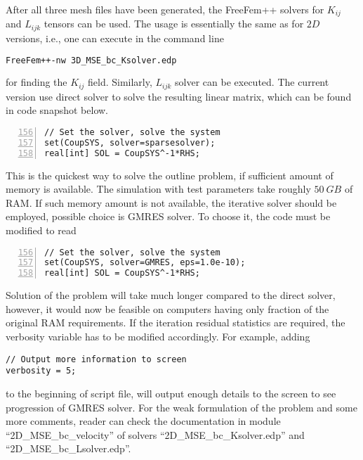 \documentclass[12pt,a4paper]{article}
\begin{document}
After all three mesh files have been generated, the FreeFem++ solvers for $K_{ij}$ and $L_{ijk}$ tensors can be used. The usage is essentially the same as for $2D$ versions, i.e., one can execute in the command line
\begin{lstlisting}[language=tex]
FreeFem++-nw 3D_MSE_bc_Ksolver.edp
\end{lstlisting}
for finding the $K_{ij}$ field. Similarly, $L_{ijk}$ solver can be executed. The current version use direct solver to solve the resulting linear matrix, which can be found in code snapshot below.
\begin{lstlisting}[numbers=left,firstnumber=156]
// Set the solver, solve the system
set(CoupSYS, solver=sparsesolver);
real[int] SOL = CoupSYS^-1*RHS;
\end{lstlisting}
This is the quickest way to solve the outline problem, if sufficient amount of memory is available. The simulation with test parameters take roughly $50\ GB$ of RAM. If such memory amount is not available, the iterative solver should be employed, possible choice is GMRES solver. To choose it, the code must be modified to read
\begin{lstlisting}[numbers=left,firstnumber=156]
// Set the solver, solve the system
set(CoupSYS, solver=GMRES, eps=1.0e-10);
real[int] SOL = CoupSYS^-1*RHS;
\end{lstlisting}
Solution of the problem will take much longer compared to the direct solver, however, it would now be feasible on computers having only fraction of the original RAM requirements. If the iteration residual statistics are required, the verbosity variable has to be modified accordingly. For example, adding
\begin{lstlisting}
// Output more information to screen
verbosity = 5;
\end{lstlisting}
to the beginning of script file, will output enough details to the screen to see progression of GMRES solver. For the weak formulation of the problem and some more comments, reader can check the documentation in module ``2D\_MSE\_bc\_velocity'' of solvers ``2D\_MSE\_bc\_Ksolver.edp'' and ``2D\_MSE\_bc\_Lsolver.edp''.
\end{document}
